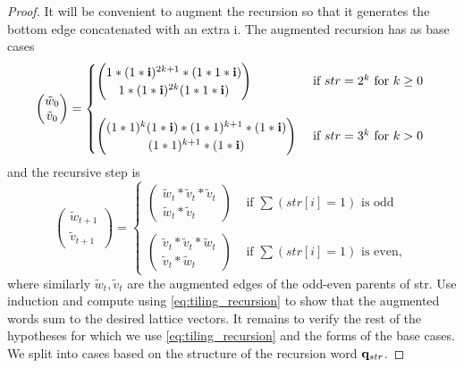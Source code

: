 \documentclass[12pt]{amsart}
\begin{document}
\begin{proof}
	
	It will be convenient to augment the recursion so that it generates the bottom edge concatenated with an extra i. The augmented
	recursion has as base cases 
	\[
	\begin{pmatrix}
	\tilde{w}_0 \\
	\tilde{v}_0 
	\end{pmatrix} 
	= \begin{cases}
	\begin{pmatrix} 1*( 1*\mathbf{i})^{2 k +1}*(1*1*\mathbf{i})  \\
	1*(1*\mathbf{i})^{2k} (1*1*\mathbf{i})
	\end{pmatrix} &\mbox{ if $str = 2^k$ for $k \geq 0$ } \\ \\
	\begin{pmatrix} 
	(1*1)^k (1*\mathbf{i}) *(1*1)^{k+1}*(1*\mathbf{i})  \\
	(1*1)^{k+1}*(1*\mathbf{i})
	\end{pmatrix} &\mbox{ if $str = 3^k$ for $k > 0$ } 
	\end{cases}
	\]
	and the recursive step is
	\begin{equation} \label{eq:tiling_recursion}
	\begin{pmatrix}
	\tilde{w}_{t+1} \\
	\tilde{v}_{t+1} 
	\end{pmatrix} 
	= \begin{cases}
	\begin{pmatrix} 
	\tilde{w}_t*\tilde{v}_t*\tilde{v}_t  \\
	\tilde{w}_t*\tilde{v}_t
	\end{pmatrix} &\mbox{ if $\sum (str[i]=1)$ is odd } \\ \\
	
	\begin{pmatrix} 
	\tilde{v}_t*\tilde{v}_t*\tilde{w}_t  \\
	\tilde{v}_t*\tilde{w}_t
	\end{pmatrix} 
	&\mbox{ if $\sum (str[i]=1)$ is even, }
	\end{cases}
	\end{equation}
	where similarly $\tilde{w}_t,\tilde{v}_t$ are the augmented edges of the odd-even parents of str. 
	Use induction and compute using \eqref{eq:tiling_recursion} to show that the augmented words sum to the desired lattice vectors. 
	It remains to verify the rest of the hypotheses for which we use \eqref{eq:tiling_recursion} and the forms of the base cases.
	We split into cases based on the structure of the recursion word $\mathbf{q}_{str}$.
	

\end{proof}
\end{document}
